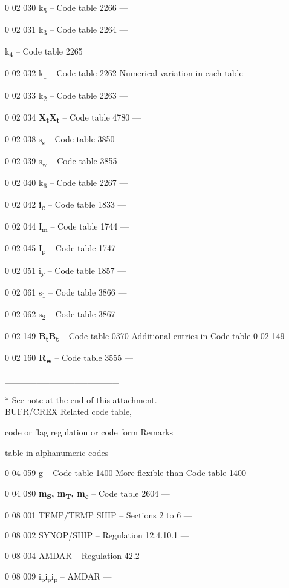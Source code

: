 0 02 030 k\textsubscript{5} -- Code table 2266 ---

0 02 031 k\textsubscript{3} -- Code table 2264 ---

k\textsubscript{4} -- Code table 2265

0 02 032 k\textsubscript{1} -- Code table 2262 Numerical variation in each table

0 02 033 k\textsubscript{2} -- Code table 2263 ---

0 02 034 \textbf{X\textsubscript{t}X\textsubscript{t}} -- Code table 4780 ---

0 02 038 s\textsubscript{s} -- Code table 3850 ---

0 02 039 s\textsubscript{w} -- Code table 3855 ---

0 02 040 k\textsubscript{6} -- Code table 2267 ---

0 02 042 \textbf{i\textsubscript{c}} -- Code table 1833 ---

0 02 044 I\textsubscript{m} -- Code table 1744 ---

0 02 045 I\textsubscript{p} -- Code table 1747 ---

0 02 051 i\textsubscript{y} -- Code table 1857 ---

0 02 061 s\textsubscript{1} -- Code table 3866 ---

0 02 062 s\textsubscript{2} -- Code table 3867 ---

0 02 149 \textbf{B\textsubscript{t}B\textsubscript{t}} -- Code table 0370 Additional entries in Code table 0 02 149

0 02 160 \textbf{R\textsubscript{w}} -- Code table 3555 ---

\_\_\_\_\_\_\_\_\_\_\_\_\_\_\_\_\_\_

* See note at the end of this attachment.\\
BUFR/CREX Related code table,

code or flag regulation or code form Remarks

table in alphanumeric codes

0 04 059 g -- Code table 1400 More flexible than Code table 1400

0 04 080 \textbf{m\textsubscript{S}, m\textsubscript{T}, m\textsubscript{c}} -- Code table 2604 ---

0 08 001 TEMP/TEMP SHIP -- Sections 2 to 6 ---

0 08 002 SYNOP/SHIP -- Regulation 12.4.10.1 ---

0 08 004 AMDAR -- Regulation 42.2 ---

0 08 009 i\textsubscript{p}i\textsubscript{p}i\textsubscript{p} -- AMDAR ---

